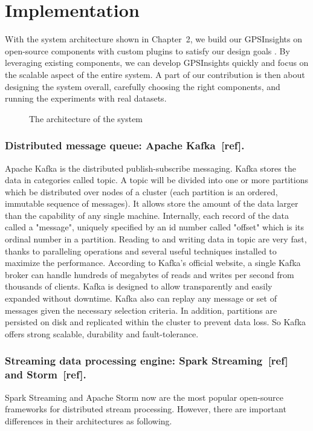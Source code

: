 \documentclass{acm_proc_article-sp}
\begin{document}
\section{Implementation} 

With the system architecture shown in Chapter~2, we build our GPSInsights on open-source components with custom plugins to satisfy our design goals . By leveraging existing components, we can develop GPSInsights quickly and focus on the scalable aspect of the entire system. A part of our contribution is then about designing the system overall,  carefully choosing the right components, and running the experiments with real datasets.  

\begin{figure}[!htb]
\centering
{}
\caption{The architecture of the system}
\end{figure}

\subsubsection{Distributed message queue: Apache Kafka~[ref].} Apache Kafka is the distributed publish-subscribe messaging. Kafka stores the data in categories called topic. A topic will be divided into one or more partitions which be distributed over nodes of a cluster (each partition is an ordered, immutable sequence of messages). It allows store the amount of the data larger than the capability of any single machine. Internally, each record of the data called a "message", uniquely specified by an id number called "offset" which is its ordinal number in a partition. 
Reading to and writing data in topic are very fast, thanks to paralleling operations and several useful techniques installed to maximize the performance. According to Kafka's official website, a single Kafka broker can handle hundreds of megabytes of reads and writes per second from thousands of clients.
Kafka is designed to allow transparently and easily expanded without downtime. Kafka also can replay any message or set of messages given the necessary selection  criteria. In addition, partitions are persisted on disk and replicated within the cluster to prevent data loss. So Kafka offers strong scalable, durability and  fault-tolerance.

\subsubsection{Streaming data processing engine: Spark Streaming~[ref] and Storm~[ref].}
Spark Streaming and Apache Storm now are the most popular open-source frameworks for distributed stream processing. However, there are important differences in their architectures as following.
\end{document}
